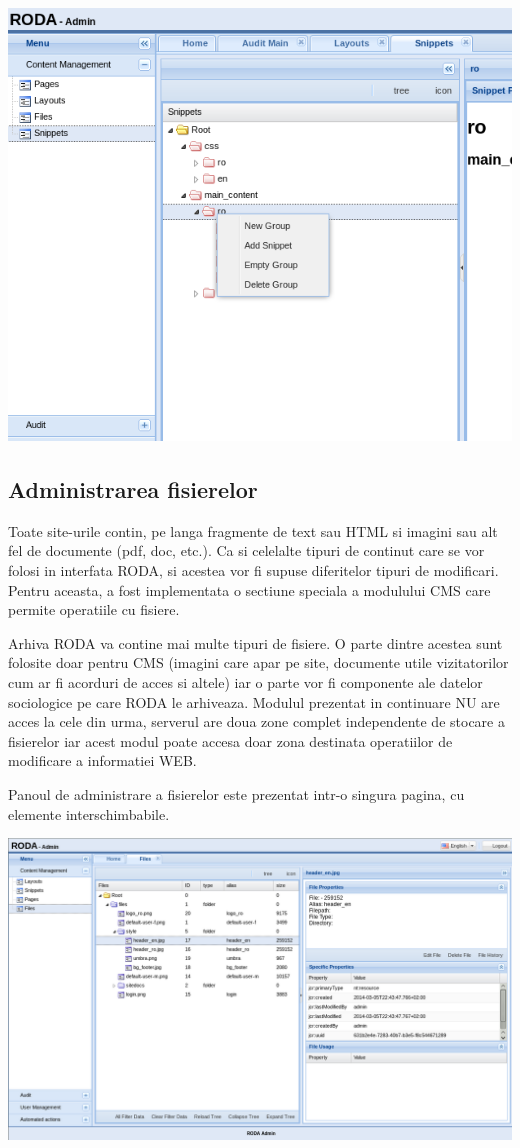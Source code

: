 \includegraphics[width=15cm]{cms/backend/snippet/snippet7}


\subsection{Administrarea fisierelor }

Toate site-urile contin, pe langa fragmente de text sau HTML si imagini
sau alt fel de documente (pdf, doc, etc.). Ca si celelalte tipuri
de continut care se vor folosi in interfata RODA, si acestea vor fi
supuse diferitelor tipuri de modificari. Pentru aceasta, a fost implementata
o sectiune speciala a modulului CMS care permite operatiile cu fisiere. 

Arhiva RODA va contine mai multe tipuri de fisiere. O parte dintre
acestea sunt folosite doar pentru CMS (imagini care apar pe site,
documente utile vizitatorilor cum ar fi acorduri de acces si altele)
iar o parte vor fi componente ale datelor sociologice pe care RODA
le arhiveaza. Modulul prezentat in continuare NU are acces la cele
din urma, serverul are doua zone complet independente de stocare a
fisierelor iar acest modul poate accesa doar zona destinata operatiilor
de modificare a informatiei WEB. 

Panoul de administrare a fisierelor este prezentat intr-o singura
pagina, cu elemente interschimbabile. 

\includegraphics[width=15cm]{cms/backend/files/files1}

